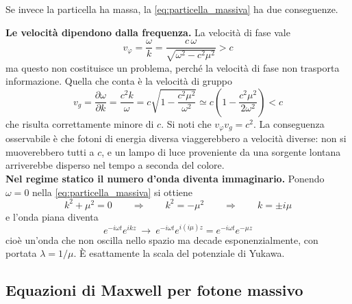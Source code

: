Se invece la particella ha massa, la \eqref{eq:particella_massiva} ha due conseguenze. 

\textbf{Le velocità dipendono dalla frequenza.} La velocità di fase vale
%
\begin{equation}
    v_\varphi = \frac{\omega}{k} = \frac{c \, \omega}{\sqrt{\omega^2 - c^2\mu^2}} > c
\end{equation}
ma questo non costituisce un problema, perché la velocità di fase non trasporta informazione. Quella che conta è la velocità di gruppo
%
\begin{equation}
    v_g = \frac{\partial \omega}{\partial k} = \frac{c^2 k}{\omega} = c\sqrt{1 - \frac{c^2\mu^2}{\omega^2}} \simeq c\left(1 - \frac{c^2\mu^2}{2\omega^2}\right) < c
\end{equation}
che risulta correttamente minore di $c$. Si noti che $v_\varphi v_g = c^2$. La conseguenza osservabile è che fotoni di energia diversa viaggerebbero a velocità diverse: non si muoverebbero tutti a $c$, e un lampo di luce proveniente da una sorgente lontana arriverebbe disperso nel tempo a seconda del colore.\\

\textbf{Nel regime statico il numero d'onda diventa immaginario.} Ponendo $\omega = 0$ nella \eqref{eq:particella_massiva} si ottiene
%
\begin{equation*}
    k^2 + \mu^2 = 0 \qquad \Longrightarrow \qquad k^2 = -\mu^2 \qquad \Longrightarrow \qquad k = \pm i\mu
\end{equation*}
e l'onda piana diventa
%
\begin{equation}
    e^{-i\omega t} e^{ikz} \ \longrightarrow \ e^{-i\omega t} e^{i(i\mu)z} = e^{-i\omega t} e^{-\mu z}
\end{equation}
cioè un'onda che non oscilla nello spazio ma decade esponenzialmente, con portata $\lambda = 1/\mu$. È esattamente la scala del potenziale di Yukawa.\\

\subsection{Equazioni di Maxwell per fotone massivo}

